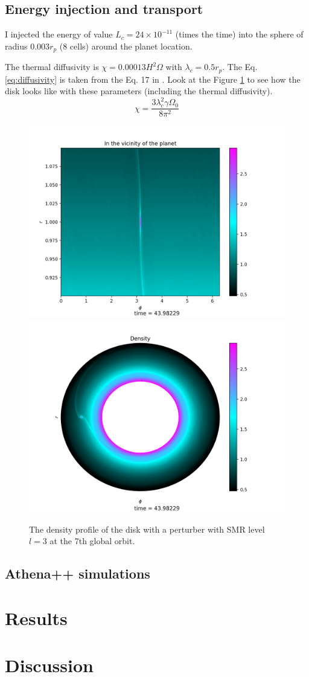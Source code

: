 \documentclass[twocolumn]{aastex631}
\begin{document}
\subsection{Energy injection and transport}
I injected the energy of value $L_c=24\times 10^{-11}$ (times the time) into the sphere of radius $0.003 r_p$ (8 cells) around the planet location.

The thermal diffusivity is $\chi=0.00013 H^2\Omega$ with $\lambda_c=0.5r_p$. The Eq. \ref{eq:diffusivity} is taken from the Eq. 17 in \citet{hankla20}. 
Look at the Figure \ref{fig:den_smr3} to see how the disk looks like with these parameters (including the thermal diffusivity). 
\begin{equation}\label{eq:diffusivity}
    \chi=\frac{3\lambda_c^2\gamma\Omega_0}{8\pi^2}
\end{equation}

\begin{figure}
\centering
	\includegraphics[width=0.48\columnwidth]{smr3zoomeddisk.png}
	\includegraphics[width=0.48\columnwidth]{smr3disk.png}
    \caption{The density profile of the disk with a perturber with SMR level $l=3$ at the 7th global orbit.}
    \label{fig:den_smr3}
\end{figure}





\subsection{Athena++ simulations}

\section{Results}
\label{sec:results}

\section{Discussion} 
\label{sec:conclusion}


\end{document}

